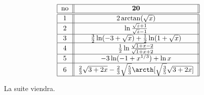 \[ \begin{tabular}{| c || c ||  }
\hline       no &         ${\bf 20}                              $                                                                                        \\    \hline \hline
             $1$   & $2\arctan(\sqrt x)   $            \\ \hline 
            $2$   &  $ \ln\frac{\sqrt z +1}{\sqrt z -1}$                 \\ \hline

           $3$   &      $\frac{3}{2}\ln(-3+\sqrt x)+\frac{1}{2}\ln(1+\sqrt x)$ 						\\ \hline 
           $4$   &      $  \frac{1}{2}   \ln\frac{\sqrt{1+ x} -2}{\sqrt{1+x} +2}       $                                                 				\\ \hline 
           $5$	  &      $-3\ln(-1+x^{1/3})+\ln x$                                                       \\ \hline   
           $6$	  &      $\frac{2}{3}\sqrt{3+2x}-\frac{2}{3}\sqrt{\frac{5}{3}}\arcth[\sqrt{\frac{3}{5}}\sqrt{3+2x}]$                                                       \\ \hline   

\end{tabular} \]


La suite viendra.
